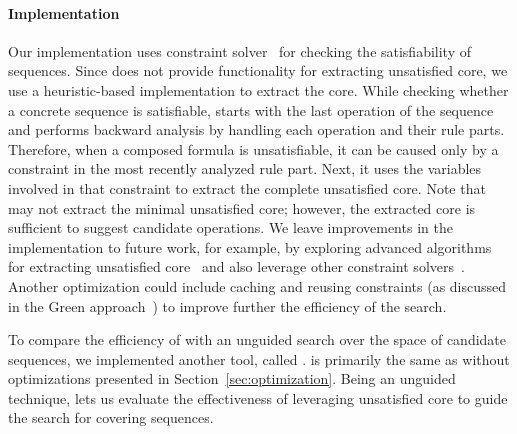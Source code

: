 \paragraph*{Implementation} Our implementation \tool{}  uses \choco{} constraint
solver~\cite{Choco} for checking the satisfiability of sequences. Since \choco{} does not provide
functionality for extracting unsatisfied core, we use a heuristic-based
implementation to extract the core. While checking whether a concrete sequence
is satisfiable, \tool{} starts with the last operation of the sequence and
performs backward analysis by handling each operation and their rule
parts. Therefore, when a composed formula is unsatisfiable, it can be caused
only by a constraint in the most recently analyzed rule part. Next,
it uses the variables involved in that constraint to extract the complete
unsatisfied core. Note that \tool{} may not extract the minimal unsatisfied
core; however, the extracted core is sufficient to suggest candidate
operations. We leave improvements in the implementation to future work, for
example, by exploring advanced algorithms for extracting unsatisfied
core~\cite{Liffiton:2008:ACM} and also leverage other constraint
solvers~\cite{DeMoura:2008}. Another optimization could include caching and
reusing constraints (\eg as discussed in the Green approach~\cite{VisserGD12})
to improve further the efficiency of the search.

To compare the efficiency of \tool{} with an unguided search
over the space of candidate sequences, we implemented another tool, called
\exhaust{}. \exhaust{} is primarily the same as \tool{} without optimizations
presented in Section~\ref{sec:optimization}. Being an unguided technique, \exhaust{} lets us evaluate the
effectiveness of leveraging unsatisfied core to guide the search for covering
sequences.


